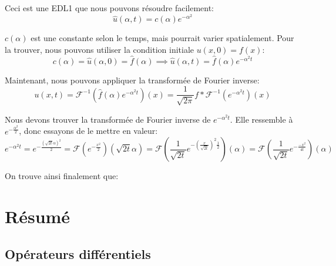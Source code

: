 \documentclass[a4paper]{article}
\begin{document}
{    Ceci est une EDL1 que nous pouvons résoudre facilement: 
    \[\hat{u}\left(\alpha, t\right) = c\left(\alpha\right) e^{-\alpha ^2}\]

    $c\left(\alpha\right)$ est une constante selon le temps, mais pourrait varier spatialement. Pour la trouver, nous pouvons utiliser la condition initiale $u\left(x, 0\right) = f\left(x\right)$: 
    \[c\left(\alpha\right) = \hat{u}\left(\alpha, 0\right) = \hat{f}\left(\alpha\right) \implies \hat{u}\left(\alpha, t\right) = \hat{f}\left(\alpha\right) e^{-\alpha ^2 t}\]
    
    Maintenant, nous pouvons appliquer la transformée de Fourier inverse: 
    \[u\left(x, t\right) = \mathcal{F}^{-1}\left(\hat{f}\left(\alpha\right) e^{-\alpha ^2 t}\right)\left(x\right) = \frac{1}{\sqrt{2\pi}} f * \mathcal{F}^{-1}\left(e^{-\alpha ^2 t}\right)\left(x\right)\]
    
    Nous devons trouver la transformée de Fourier inverse de $e^{-\alpha ^2 t}$. Elle ressemble à $e^{-\frac{\alpha ^2}{2}}$, donc essayons de le mettre en valeur: 
    \[e^{- \alpha ^2 t} = e^{- \frac{\left(\sqrt{2t} \alpha\right)^2}{2}} = \mathcal{F}\left(e^{-\frac{x^2}{2}}\right)\left(\sqrt{2t} \alpha\right) = \mathcal{F}\left(\frac{1}{\sqrt{2t}} e^{-\left(\frac{x}{\sqrt{2t}}\right)^2 \frac{1}{2}}\right)\left(\alpha\right) = \mathcal{F}\left(\frac{1}{\sqrt{2t}} e^{-\frac{-x^2}{4t}}\right)\left(\alpha\right)\]

    On trouve ainsi finalement que: 
}

\section{Résumé}
\subsection{Opérateurs différentiels}
\end{document}
